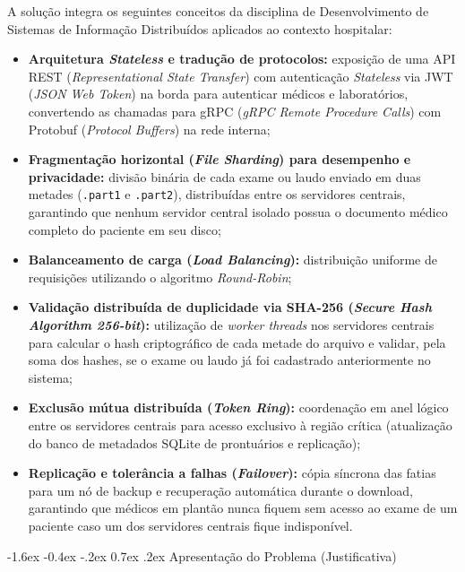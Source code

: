\documentclass[12pt]{article}
\makeatletter
\renewcommand\section{\@startsection {section}{1}{\z@}%
    {-1.6ex \@plus -0.4ex \@minus -.2ex}%
    {0.7ex \@plus.2ex}%
    {\normalfont\large\bfseries}}
\makeatother
\begin{document}
A solução integra os seguintes conceitos da disciplina de Desenvolvimento de Sistemas de Informação Distribuídos aplicados ao contexto hospitalar:
\begin{itemize}
    \item \textbf{Arquitetura \textit{Stateless} e tradução de protocolos:} exposição de uma API REST (\textit{Representational State Transfer}) com autenticação \textit{Stateless} via JWT (\textit{JSON Web Token}) na borda para autenticar médicos e laboratórios, convertendo as chamadas para gRPC (\textit{gRPC Remote Procedure Calls}) com Protobuf (\textit{Protocol Buffers}) na rede interna;
    \item \textbf{Fragmentação horizontal (\textit{File Sharding}) para desempenho e privacidade:} divisão binária de cada exame ou laudo enviado em duas metades (\texttt{.part1} e \texttt{.part2}), distribuídas entre os servidores centrais, garantindo que nenhum servidor central isolado possua o documento médico completo do paciente em seu disco;
    \item \textbf{Balanceamento de carga (\textit{Load Balancing}):} distribuição uniforme de requisições utilizando o algoritmo \textit{Round-Robin};
    \item \textbf{Validação distribuída de duplicidade via SHA-256 (\textit{Secure Hash Algorithm 256-bit}):} utilização de \textit{worker threads} nos servidores centrais para calcular o hash criptográfico de cada metade do arquivo e validar, pela soma dos hashes, se o exame ou laudo já foi cadastrado anteriormente no sistema;
    \item \textbf{Exclusão mútua distribuída (\textit{Token Ring}):} coordenação em anel lógico entre os servidores centrais para acesso exclusivo à região crítica (atualização do banco de metadados SQLite de prontuários e replicação);
    \item \textbf{Replicação e tolerância a falhas (\textit{Failover}):} cópia síncrona das fatias para um nó de backup e recuperação automática durante o download, garantindo que médicos em plantão nunca fiquem sem acesso ao exame de um paciente caso um dos servidores centrais fique indisponível.
\end{itemize}

\section{Apresentação do Problema (Justificativa)}
\end{document}
